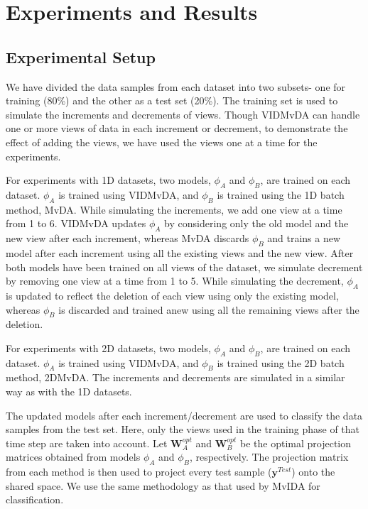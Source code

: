 \section{Experiments and Results}
\label{sec:VIDMvDA_Expt}

\subsection{Experimental Setup}
\label{subs:VIDMvDA_Expt_Setup}
We have divided the data samples from each dataset into two subsets- one for training (80\%) and the other as a test set (20\%). The training set is used to simulate the increments and decrements of views. Though VIDMvDA can handle one or more views of data in each increment or decrement, to demonstrate the effect of adding the views, we have used the views one at a time for the experiments.

For experiments with 1D datasets, two models, $\phi_A$ and $\phi_B$, are trained on each dataset. $\phi_A$ is trained using VIDMvDA, and $\phi_B$ is trained using the 1D batch method, MvDA. While simulating the increments, we add one view at a time from 1 to 6. VIDMvDA updates $\phi_A$ by considering only the old model and the new view after each increment, whereas MvDA discards $\phi_B$ and trains a new model after each increment using all the existing views and the new view. After both models have been trained on all views of the dataset, we simulate decrement by removing one view at a time from 1 to 5. While simulating the decrement, $\phi_A$ is updated to reflect the deletion of each view using only the existing model, whereas $\phi_B$ is discarded and trained anew using all the remaining views after the deletion.

For experiments with 2D datasets, two models, $\phi_A$ and $\phi_B$, are trained on each dataset. $\phi_A$ is trained using VIDMvDA, and $\phi_B$ is trained using the 2D batch method, 2DMvDA. The increments and decrements are simulated in a similar way as with the 1D datasets.

The updated models after each increment/decrement are used to classify the data samples from the test set. Here, only the views used in the training phase of that time step are taken into account. Let $\textbf{W}^{opt}_A$ and $\textbf{W}^{opt}_B$ be the optimal projection matrices obtained from models $\phi_A$ and $\phi_B$, respectively. The projection matrix from each method is then used to project every test sample ($\textbf{y}^{Test}$) onto the shared space. We use the same methodology as that used by MvIDA for classification.






